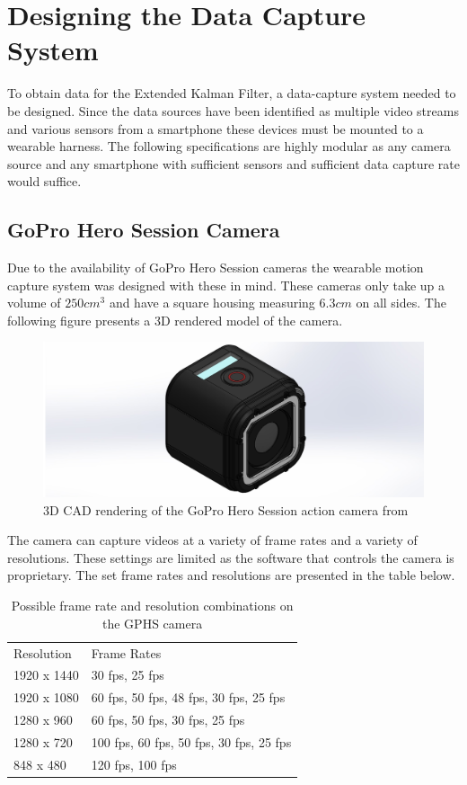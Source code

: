 \chapter{Designing the Data Capture System}
To obtain data for the Extended Kalman Filter, a data-capture system needed to be designed. Since the data sources have been identified as multiple video streams and various sensors from a smartphone these devices must be mounted to a wearable harness. The following specifications are highly modular as any camera source and any smartphone with sufficient sensors and sufficient data capture rate would suffice. 

\section{GoPro Hero Session Camera}
Due to the availability of GoPro Hero Session cameras the wearable motion capture system was designed with these in mind. These cameras only take up a volume of $250cm^3$ and have a square housing measuring $6.3cm$ on all sides. The following figure presents a 3D rendered model of the camera.

\begin{figure}[!ht] 
\captionsetup{width=0.8\linewidth, font=small}  
\includegraphics[width=0.9\linewidth]{figures/GoProHero4Session.JPG}
\caption{3D CAD rendering of the GoPro Hero Session action camera from \cite{gph4smodelgrabcad}}
\label{fig:GoProHero4Session}
\end{figure}

The camera can capture videos at a variety of frame rates and a variety of resolutions. These settings are limited as the software that controls the camera is proprietary. The set frame rates and resolutions are presented in the table below.

\begin{table}[!ht]
\centering
\captionsetup{width=0.8\linewidth, font=small}  
\caption{Possible frame rate and resolution combinations on the GPHS camera}
\label{framesres}
\begin{tabular}{ll}
Resolution  & Frame Rates                             \\
1920 x 1440 & 30 fps, 25 fps                          \\
1920 x 1080 & 60 fps, 50 fps, 48 fps, 30 fps, 25 fps  \\
1280 x 960  & 60 fps, 50 fps, 30 fps, 25 fps          \\
1280 x 720  & 100 fps, 60 fps, 50 fps, 30 fps, 25 fps \\
848 x 480   & 120 fps, 100 fps                       
\end{tabular}
\end{table}

